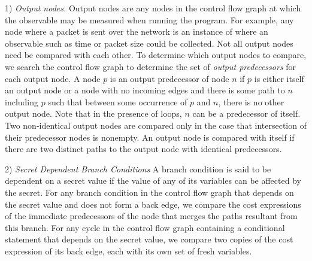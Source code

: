 1)\textit{ Output nodes.} Output nodes are any nodes in the control flow graph at which the observable may be measured when running the program. For example, any node where a packet is sent over the network is an instance of where an observable such as time or packet size could be collected. Not all output nodes need be compared with each other. To determine which output nodes to compare, we search the control flow graph to determine the set of \textit{output predecessors} for each output node. A node $p$ is an output predecessor of node $n$ if $p$ is either itself an output node or a node with no incoming edges and there is some path to $n$ including $p$ such that between some occurrence of $p$ and $n$, there is no other output node. Note that in the presence of loops, $n$ can be a predecessor of itself. Two non-identical output nodes are compared only in the case that intersection of their predecessor nodes is nonempty. An output node is compared with itself if there are two distinct paths to the output node with identical predecessors.  

2) \textit{ Secret Dependent Branch Conditions}  A branch condition is said to be dependent on a secret value if the value of any of its variables can be affected by the secret. For any branch condition in the control flow graph that depends on the secret value and does not form a back edge, we compare the cost expressions of the immediate predecessors of the node that merges the paths resultant from this branch. For any cycle in the control flow graph containing a conditional statement that depends on the secret value, we compare two copies of the cost expression of its back edge, each with its own set of fresh variables. 





